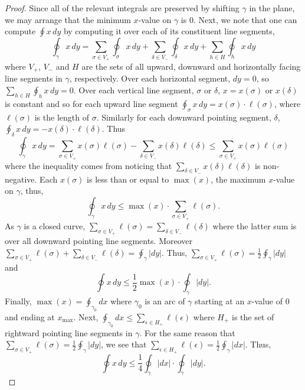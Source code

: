 \documentclass[11pt]{amsart}
\theoremstyle{remark}
\newcommand{\Sum}{\displaystyle\sum}
\newcommand{\Oint}{\displaystyle\oint}
\newcommand{\chris}[1]{\textcolor{purple}{[Chris] #1}}
\begin{document}
\begin{proof}


Since all of the relevant integrals are preserved by shifting $\gamma$ in the plane, we may arrange that the minimum $x$-value on $\gamma$ is $0$.  Next, we note that one can compute $\Oint x\, dy$ by computing it over each of its constituent line segments, 
$$
\Oint_{\gamma} x\, dy = \Sum_{\sigma\in V_+}\oint_{\sigma} x\, dy+\Sum_{\delta\in V_-}\oint_{\delta} x\, dy+\Sum_{h\in H}\oint_{h} x\, dy
$$
where $V_+$, $V_-$ and $H$ are the sets of all upward, downward and horizontally facing line segments in $\gamma$, respectively.  Over each horizontal segment, $dy=0$, so $\Sum_{h\in H}\oint_{h} x\, dy=0$.  Over each   vertical line segment, $\sigma$ or $\delta$, $x = x(\sigma)$ or $x(\delta)$ is constant and so for each upward line segment $\Oint_{\sigma} x\, dy = x(\sigma)\cdot \ell(\sigma)$, where $\ell(\sigma)$ is the length of $\sigma$.  Similarly for each downward pointing segment, $\delta$, $\Oint_{\delta} x\, dy = -x(\delta)\cdot \ell(\delta)$.  Thus
$$
    \oint_\gamma x\, dy = \sum_{\sigma\in V_+} x(\sigma)\ell(\sigma) - \sum_{\delta\in V_-} x(\delta)\ell(\delta) \leq \sum _{\sigma\in V_+}x(\sigma)\ell(\sigma) $$
where the inequality comes from noticing that $\Sum_{\delta\in V_-} x(\delta)\ell(\delta)$ is non-negative.  Each $x(\sigma)$ is less than or equal to $\max (x)$, the maximum $x$-value on $\gamma$, thus,
$$
    \oint_\gamma x\, dy \leq \max( x)\cdot\sum_{\sigma\in V_+}\ell(\sigma). $$
    As $\gamma$ is a closed curve, $\Sum_{\sigma\in V_+}\ell(\sigma) = \Sum_{\delta\in V_-}\ell(\delta)$ where the latter sum is over all downward pointing line segments.  Moreover $\Sum_{\sigma\in V_+}\ell(\sigma) + \Sum_{\delta\in V_-}\ell(\delta) = \Oint_{\gamma} |dy|$.  Thus, $\Sum_{\sigma\in V_+}\ell(\sigma) = \frac{1}{2}\Oint_{\gamma} |dy|$ and 
    $$
    \oint x\, dy \leq \frac{1}{2} \max(x) \cdot \Oint_{\gamma} |dy|. $$
    Finally, $\max (x)=\Oint_{\gamma_0} dx$ where $\gamma_0$ is an arc of $\gamma$ starting at an $x$-value of $0$ and ending at $x_{\max}$.  Next, $\Oint_{\gamma_0} dx\le \sum_{\epsilon\in H_+}\ell(\epsilon)$ where $H_+$ is the set of rightward pointing line segments in $\gamma$.  For the same reason that $\Sum_{\sigma\in V_+}\ell(\sigma) = \frac{1}{2}\Oint_{\gamma} |dy|$, we see that  $\Sum_{\epsilon\in H_+}\ell(\epsilon) = \frac{1}{2}\oint_\gamma|dx|$.  Thus,
    $$
    \oint x\, dy \leq \frac{1}{4}\Oint_{\gamma}|dx|\cdot \Oint_{\gamma}|dy|. $$
\end{proof}
\end{document}
